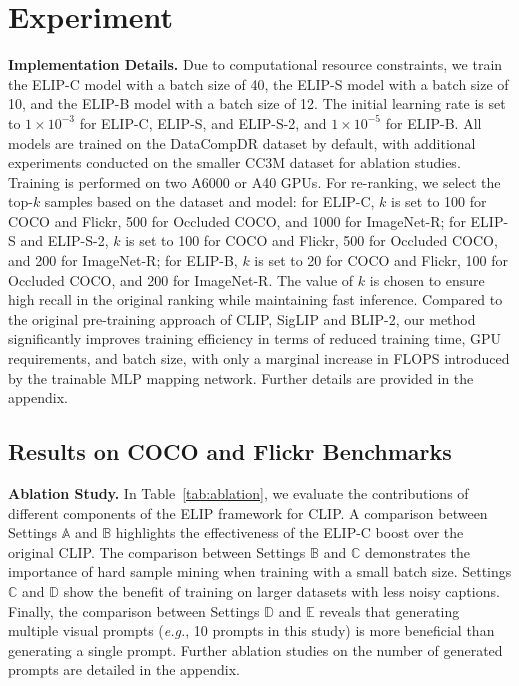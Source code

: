 \section{Experiment}
\label{sec:experiment}

\noindent \textbf{Implementation Details.}
Due to computational resource constraints, 
we train the ELIP-C model with a batch size of 40, 
the ELIP-S model with a batch size of 10, 
and the ELIP-B model with a batch size of 12. 
The initial learning rate is set to $1 \times 10^{-3}$ for ELIP-C, ELIP-S, and ELIP-S-2, and $1 \times 10^{-5}$ for ELIP-B. 
All models are trained on the DataCompDR dataset by default, 
with additional experiments conducted on the smaller CC3M dataset for ablation studies. Training is performed on two A6000 or A40 GPUs. 
For re-ranking, we select the top-$k$ samples based on the dataset and model: for ELIP-C, $k$ is set to 100 for COCO and Flickr, 500 for Occluded COCO, and 1000 for ImageNet-R; for ELIP-S and ELIP-S-2, $k$ is set to 100 for COCO and Flickr, 500 for Occluded COCO, and 200 for ImageNet-R; for ELIP-B, $k$ is set to 20 for COCO and Flickr, 100 for Occluded COCO, and 200 for ImageNet-R. 
The value of $k$ is chosen to ensure high recall in the original ranking while maintaining fast inference. 
Compared to the original pre-training approach of CLIP, SigLIP and BLIP-2, our method significantly improves training efficiency in terms of reduced training time, GPU requirements, and batch size, with only a marginal increase in FLOPS introduced by the trainable MLP mapping network. Further details are provided in the appendix.


\subsection{Results on COCO and Flickr Benchmarks}
\label{sec:results_coco_flickr}

\noindent \textbf{Ablation Study.}
In Table~\ref{tab:ablation}, we evaluate the contributions of different components of the ELIP framework for CLIP. 
A comparison between Settings $\mathbb{A}$ and $\mathbb{B}$ highlights the effectiveness of the ELIP-C boost over the original CLIP. 
The comparison between Settings $\mathbb{B}$ and $\mathbb{C}$ demonstrates the importance of hard sample mining when training with a small batch size. Settings $\mathbb{C}$ and $\mathbb{D}$ show the benefit of training on larger datasets with less noisy captions. Finally, the comparison between Settings $\mathbb{D}$ and $\mathbb{E}$ reveals that generating multiple visual prompts ({\em e.g.}, 10 prompts in this study) is more beneficial than generating a single prompt. Further ablation studies on the number of generated prompts are detailed in the appendix.


